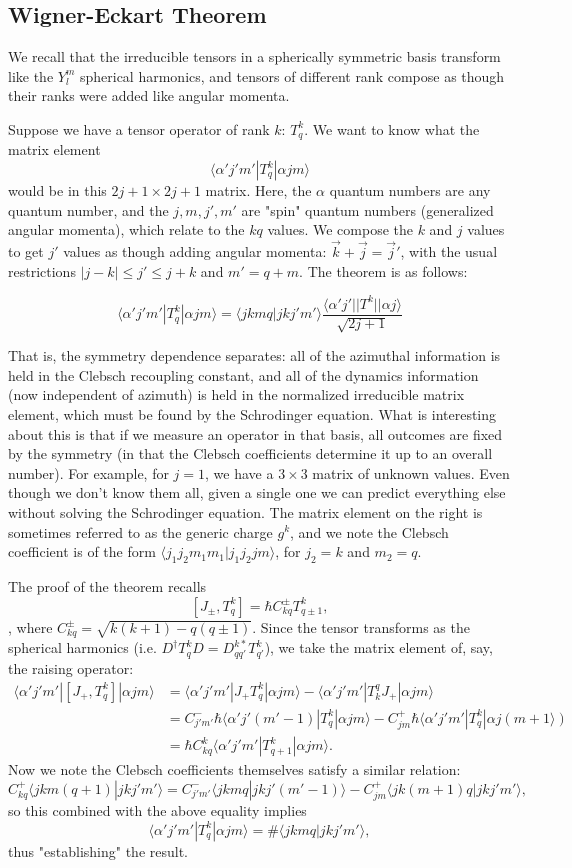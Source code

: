 \documentclass[fontsize=12pt]{scrartcl}
\newcommand{\la}{\langle}
\newcommand{\ra}{\rangle}
\begin{document}
\subsection{Wigner-Eckart Theorem}
We recall that the irreducible tensors in a spherically symmetric basis transform like the $Y_l^m$ spherical harmonics, and tensors of different rank compose as though their ranks were added like angular momenta.

Suppose we have a tensor operator of rank $k$: $T_q^k$. We want to know what the matrix element $$\la \alpha'j'm'|T_q^k|\alpha j m\ra$$ would be in this $2j+1\times 2j+1$ matrix. Here, the $\alpha$ quantum numbers are any quantum number, and the $j,m,j',m'$ are "spin" quantum numbers (generalized angular momenta), which relate to the $kq$ values. We compose the $k$ and $j$ values to get $j'$ values as though adding angular momenta: $\vec{k}+\vec{j}=\vec{j}'$, with the usual restrictions $|j-k|\leq j' \leq j+k$ and $m'=q+m$. The theorem is as follows: \begin{mdframed}
	$$\la \alpha'j'm'|T_q^k|\alpha j m\ra = \la jkmq|jkj'm'\ra \frac{\la \alpha' j' ||T^k||\alpha j\ra}{\sqrt{2j+1}}$$
\end{mdframed} That is, the symmetry dependence separates: all of the azimuthal information is held in the Clebsch recoupling constant, and all of the dynamics information (now independent of azimuth) is held in the normalized irreducible matrix element, which must be found by the Schrodinger equation. What is interesting about this is that if we measure an operator in that basis, all outcomes are fixed by the symmetry (in that the Clebsch coefficients determine it up to an overall number). For example, for $j=1$, we have a $3\times 3$ matrix of unknown values. Even though we don't know them all, given a single one we can predict everything else without solving the Schrodinger equation. The matrix element on the right is sometimes referred to as the generic charge $g^k$, and we note the Clebsch coefficient is of the form $\la j_1j_2 m_1m_1|j_1j_2jm\ra$, for $j_2=k$ and $m_2=q$.

The proof of the theorem recalls $$[J_\pm,T_q^k]=\hbar C_{kq}^\pm T_{q\pm 1}^k,$$, where $C_{kq}^\pm = \sqrt{k(k+1)-q(q\pm 1)}$. Since the tensor transforms as the spherical harmonics (i.e. $D^\dagger T_q^k D=D^{k*}_{qq'}T_{q'}^k$), we take the matrix element of, say, the raising operator: \begin{align*}
\la \alpha'j'm'|[J_+,T_q^k]|\alpha j m\ra &= \la \alpha'j'm'| J_+T_q^k|\alpha jm\ra - \la \alpha'j'm'|T_k^q J_+|\alpha j m\ra \\
&=C^-_{j'm'}\hbar \la \alpha'j'(m'-1)|T_q^k|\alpha jm\ra-C_{jm}^+\hbar \la \alpha'j'm'|T_q^k|\alpha j (m+1\ra)\\
&= \hbar C_{kq}^k\la \alpha'j'm'|T_{q+1}^k|\alpha jm\ra.
\end{align*} Now we note the Clebsch coefficients themselves satisfy a similar relation: $$C_{kq}^+\la jkm(q+1)|jkj'm'\ra = C_{j'm'}^- \la jkmq|jkj'(m'-1)\ra - C_{jm}^+\la jk(m+1)q|jkj'm'\ra,$$ so this combined with the above equality implies $$\la \alpha'j'm'|T_q^k|\alpha jm\ra = \#\la jkmq|jkj'm'\ra,$$ thus "establishing" the result.
\end{document}
